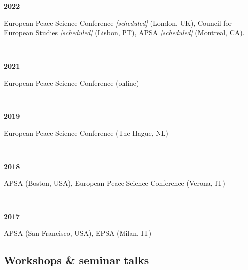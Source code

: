 \documentclass[a4paper, 12pt]{article}
\begin{document}
\begin{minipage}[t]{0.1\textwidth}
\textbf{2022}
\end{minipage}\hfill\begin{minipage}[t]{0.9\textwidth}
European Peace Science Conference \textit{[scheduled]} (London, UK), Council for European Studies \textit{[scheduled]} (Lisbon, PT), APSA \textit{[scheduled]} (Montreal, CA).\\\vspace{-10pt}
\end{minipage}\\
\begin{minipage}[t]{0.1\textwidth}
\textbf{2021}
\end{minipage}\hfill\begin{minipage}[t]{0.9\textwidth}
European Peace Science Conference (online)
\end{minipage}\\
\begin{minipage}[t]{0.1\textwidth}
\textbf{2019}
\end{minipage}\hfill\begin{minipage}[t]{0.9\textwidth}
European Peace Science Conference (The Hague, NL)
\end{minipage}\\
\begin{minipage}[t]{0.1\textwidth}
\textbf{2018}
\end{minipage}\hfill
\begin{minipage}[t]{0.9\textwidth}
APSA (Boston, USA), European Peace Science Conference (Verona, IT)
\end{minipage}\\
\begin{minipage}[t]{0.1\textwidth}
\textbf{2017}
\end{minipage}\hfill
\begin{minipage}[t]{0.9\textwidth}
APSA (San Francisco, USA), EPSA (Milan, IT)
\end{minipage}

\subsection*{Workshops \& seminar talks}
\end{document}
